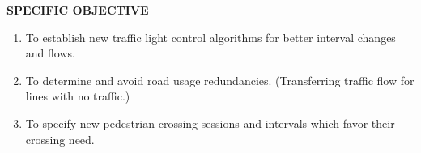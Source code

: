 \documentclass[11pt,a4paper,final]{report}
\begin{document}
\noindent 

\noindent \textbf{SPECIFIC OBJECTIVE}

\begin{enumerate}
\item \textbf{ }To establish new traffic light control algorithms for better interval changes and flows.

\item  To determine and avoid road usage redundancies. (Transferring traffic flow for lines with no traffic.)

\item  To specify new pedestrian crossing sessions and intervals which favor their crossing need.
\end{enumerate}
 
\end{document}
